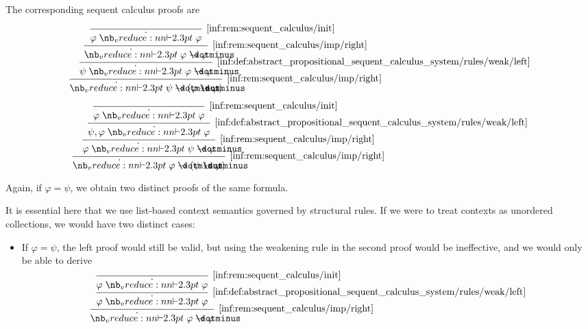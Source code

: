 \begin{example}
  The corresponding sequent calculus proofs are
  \begin{paracol}{2}
    \begin{leftcolumn}
      \ParacolAlignmentHack
      \begin{equation*}
        \begin{prooftree}
          \infer0[\ref{inf:rem:sequent_calculus/init}]{ \varphi \synvdash \varphi }
          \infer1[\ref{inf:rem:sequent_calculus/imp/right}]{ \synvdash \varphi \synimplies \varphi }
          \infer1[\ref{inf:def:abstract_propositional_sequent_calculus_system/rules/weak/left}]{ \psi \synvdash \varphi \synimplies \varphi }
          \infer1[\ref{inf:rem:sequent_calculus/imp/right}]{ \synvdash \psi \synimplies (\varphi \synimplies \varphi) }
        \end{prooftree}
      \end{equation*}
    \end{leftcolumn}

    \begin{rightcolumn}
      \ParacolAlignmentHack
      \begin{equation*}
        \begin{prooftree}
          \infer0[\ref{inf:rem:sequent_calculus/init}]{ \varphi \synvdash \varphi }
          \infer1[\ref{inf:def:abstract_propositional_sequent_calculus_system/rules/weak/left}]{ \psi, \varphi \synvdash \varphi }
          \infer1[\ref{inf:rem:sequent_calculus/imp/right}]{ \varphi \synvdash \psi \synimplies \varphi }
          \infer1[\ref{inf:rem:sequent_calculus/imp/right}]{ \synvdash \varphi \synimplies (\psi \synimplies \varphi) }
        \end{prooftree}
      \end{equation*}
    \end{rightcolumn}
  \end{paracol}

  Again, if \( \varphi = \psi \), we obtain two distinct proofs of the same formula.

  It is essential here that we use list-based context semantics governed by structural rules. If we were to treat contexts as unordered collections, we would have two distinct cases:
  \begin{itemize}
    \item If \( \varphi = \psi \), the left proof would still be valid, but using the weakening rule in the second proof would be ineffective, and we would only be able to derive
    \begin{equation*}
      \begin{prooftree}
        \infer0[\ref{inf:rem:sequent_calculus/init}]{ \varphi \synvdash \varphi }
        \infer1[\ref{inf:def:abstract_propositional_sequent_calculus_system/rules/weak/left}]{ \varphi \synvdash \varphi }
        \infer1[\ref{inf:rem:sequent_calculus/imp/right}]{ \synvdash \varphi \synimplies \varphi }
      \end{prooftree}
    \end{equation*}


\end{itemize}
\end{example}
